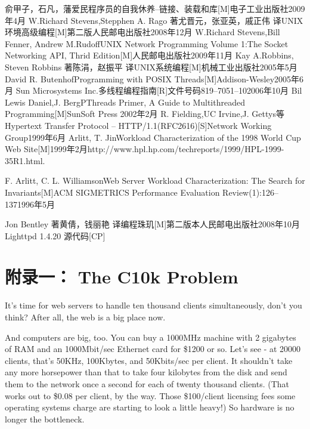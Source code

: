 \documentclass[twoside, xetex]{report}
\begin{document}
\five
\begin{thebibliography}{99}
俞甲子，石凡，藩爱民\quad 程序员的自我休养--链接、装载和库[M]\quad 电子工业出版社\quad 2009年4月
W.Richard Stevens,Stepphen A. Rago 著\quad 尤晋元，张亚英，戚正伟 译\quad UNIX环境高级编程[M]\quad 第二版\quad 人民邮电出版社\quad 2008年12月
W.Richard Stevens,Bill Fenner, Andrew M.Rudoff\quad UNIX Network Programming Volume 1:The Socket Networking API, Thrid Edition[M]\quad 人民邮电出版社\quad 2009年11月
Kay A.Robbins, Steven Robbins 著\quad 陈涓，赵振平 译\quad UNIX系统编程[M]\quad 机械工业出版社\quad 2005年5月
David R. Butenhof\quad Programming with POSIX Threads[M]\quad Addison-Wesley\quad 2005年6月
Sun Microsystems Inc.\quad 多线程编程指南[R]\quad 文件号码819–7051–10\quad 2006年10月
Bil Lewis Daniel,J. Berg\quad PThreads Primer, A Guide to Multithreaded Programming[M]\quad SunSoft Press 2002年2月
R. Fielding,UC Irvine,J. Gettys等\quad Hypertext Transfer Protocol -- HTTP/1.1(RFC2616)[S]\quad Network Working Group\quad 1999年6月
Arlitt, T. Jin\quad Workload Characterization of the 1998 World Cup Web Site[M]\quad 1999年2月\quad http://www.hpl.hp.com/techreports/1999/HPL-1999-35R1.html.

F. Arlitt, C. L. Williamson\quad Web Server Workload Characterization: The Search for Invariants[M]\quad ACM SIGMETRICS Performance Evaluation Review(1):126–137\quad 1996年5月

Jon Bentley 著\quad 黄倩，钱丽艳 译\quad 编程珠玑[M]\quad 第二版本\quad 人民邮电出版社\quad 2008年10月
Lighttpd 1.4.20 源代码[CP]
\end{thebibliography}

\titleformat{\chapter}{\center \three \bf}{}{1em}{}

\lfour
\chapter{附录一： The C10k Problem}

It's time for web servers to handle ten thousand clients simultaneously, don't you think? After all, the web is a big place now.

And computers are big, too. You can buy a 1000MHz machine with 2 gigabytes of RAM and an 1000Mbit/sec Ethernet card for \$1200 or so. Let's see - at 20000 clients, that's 50KHz, 100Kbytes, and 50Kbits/sec per client. It shouldn't take any more horsepower than that to take four kilobytes from the disk and send them to the network once a second for each of twenty thousand clients. (That works out to \$0.08 per client, by the way. Those \$100/client licensing fees some operating systems charge are starting to look a little heavy!) So hardware is no longer the bottleneck.
\end{document}

